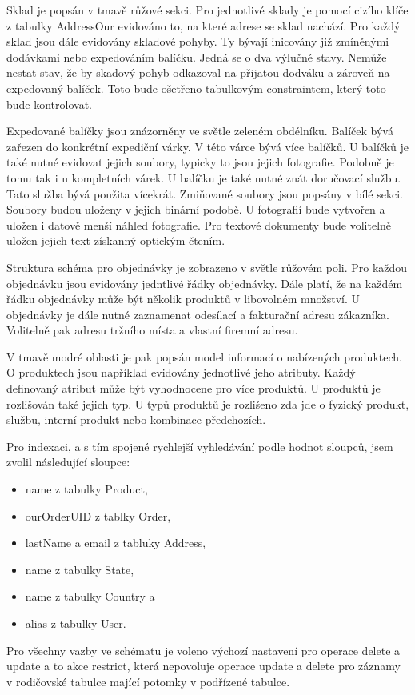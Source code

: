 \documentclass[thesis=B,czech]{FITthesis}[2012/06/26]
\begin{document}
	Sklad je popsán v tmavě růžové sekci. Pro jednotlivé sklady je pomocí cizího klíče z tabulky AddressOur evidováno to, na které adrese se sklad nachází. Pro každý sklad jsou dále evidovány skladové pohyby. Ty bývají inicovány již zmíněnými dodávkami nebo expedováním balíčku. Jedná se o dva výlučné stavy. Nemůže nestat stav, že by skadový pohyb odkazoval na přijatou dodváku a zároveň na expedovaný balíček. Toto bude ošetřeno tabulkovým constraintem, který toto bude kontrolovat.
	
	Expedované balíčky jsou znázorněny ve světle zeleném obdélníku. Balíček bývá zařezen do konkrétní expediční várky. V této várce bývá více balíčků. U balíčků je také nutné evidovat jejich soubory, typicky to jsou jejich fotografie. Podobně je tomu tak i u kompletních várek. U balíčku je také nutné znát doručovací službu. Tato služba bývá použita vícekrát. Zmiňované soubory jsou popsány v bílé sekci. Soubory budou uloženy v jejich binární podobě. U fotografií bude vytvořen a uložen i datově menší náhled fotografie. Pro textové dokumenty bude volitelně uložen jejich text získanný optickým čtením.

	Struktura schéma pro objednávky je zobrazeno v světle růžovém poli. Pro každou objednávku jsou evidovány jedntlivé řádky objednávky. Dále platí, že na každém řádku objednávky může být několik produktů v libovolném množství. U objednávky je dále nutné zaznamenat odesílací a fakturační adresu zákazníka. Volitelně pak adresu tržního místa a vlastní firemní adresu.
	
	V tmavě modré oblasti je pak popsán model informací o nabízených produktech. O produktech jsou například evidovány jednotlivé jeho atributy. Každý definovaný atribut může být vyhodnocene pro více produktů. U produktů je rozlišován také jejich typ. U typů produktů je rozlišeno zda jde o fyzický produkt, službu, interní produkt nebo kombinace předchozích.
	
	Pro indexaci, a s tím spojené rychlejší vyhledávání podle hodnot sloupců, jsem zvolil následující sloupce: 
	\begin{itemize}
		\item name z tabulky Product,
		\item ourOrderUID z tablky Order,
		\item lastName a email z tabluky Address,
		\item name z tabulky State,
		\item name z tabulky Country a
		\item alias z tabulky User.
	\end{itemize}
	Pro všechny vazby ve schématu je voleno výchozí nastavení pro operace delete a update a to akce restrict, která nepovoluje operace update a delete pro záznamy v rodičovské tabulce mající potomky v podřízené tabulce.
	
\end{document}
